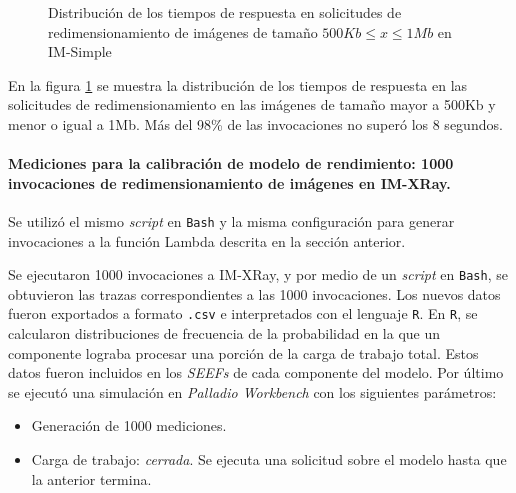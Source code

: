 \begin{figure}[h]
\hspace{-2.0cm}
\caption{Distribución de los tiempos de respuesta en solicitudes de redimensionamiento de imágenes de tamaño $500Kb \leq x \leq 1Mb$ en IM-Simple}
\label{fig:distribucion-solicitudes-imagenes-hasta-1mb}
\end{figure}


En la figura \ref{fig:distribucion-solicitudes-imagenes-hasta-1mb} se muestra la distribución de los tiempos de respuesta en las solicitudes de redimensionamiento en las imágenes de tamaño mayor a 500Kb y menor o igual a 1Mb. Más del 98\% de las invocaciones no superó los 8 segundos.

\paragraph{Mediciones para la calibración de modelo de rendimiento: 1000 invocaciones de redimensionamiento de imágenes en IM-XRay.} Se utilizó el mismo \emph{script} en \texttt{Bash} y la misma configuración para generar invocaciones a la función Lambda descrita en la sección anterior.

Se ejecutaron 1000 invocaciones a IM-XRay, y por medio de un \emph{script} en \texttt{Bash}, se obtuvieron las trazas correspondientes a las 1000 invocaciones. Los nuevos datos fueron exportados a formato \texttt{.csv} e interpretados con el lenguaje \texttt{R}. En \texttt{R}, se calcularon distribuciones de frecuencia de la probabilidad en la que un componente lograba procesar una porción de la carga de trabajo total. Estos datos fueron incluidos en los \emph{SEEFs} de cada componente del modelo. Por último se ejecutó una simulación en \emph{Palladio Workbench} con los siguientes parámetros:
\begin{itemize}
    \item Generación de 1000 mediciones.
    \item Carga de trabajo: \emph{cerrada}. Se ejecuta una solicitud sobre el modelo hasta que la anterior termina. 
\end{itemize}

